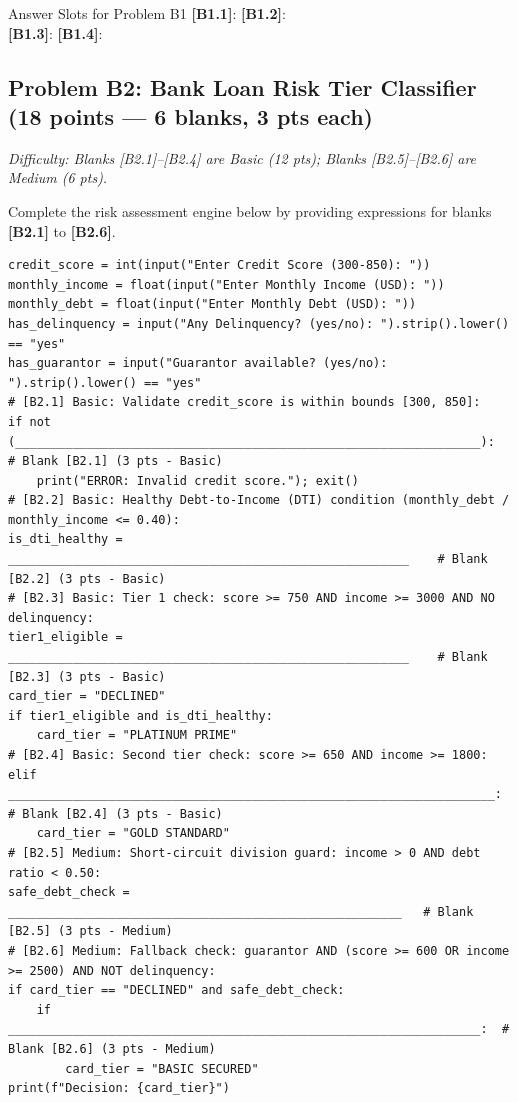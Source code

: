 \documentclass[11pt,a4paper]{article}
\begin{document}
\begin{answerbox}[height=2.0cm]{Answer Slots for Problem B1}
\textbf{[B1.1]}: \dotfill \quad \textbf{[B1.2]}: \dotfill\\[1.5mm]
\textbf{[B1.3]}: \dotfill \quad \textbf{[B1.4]}: \dotfill
\end{answerbox}

\newpage


\subsection*{Problem B2: Bank Loan Risk Tier Classifier (18 points --- 6 blanks, 3 pts each)}
\textit{Difficulty: Blanks [B2.1]--[B2.4] are Basic (12 pts); Blanks [B2.5]--[B2.6] are Medium (6 pts).}

Complete the risk assessment engine below by providing expressions for blanks \textbf{[B2.1]} to \textbf{[B2.6]}.

\begin{lstlisting}
credit_score = int(input("Enter Credit Score (300-850): "))
monthly_income = float(input("Enter Monthly Income (USD): "))
monthly_debt = float(input("Enter Monthly Debt (USD): "))
has_delinquency = input("Any Delinquency? (yes/no): ").strip().lower() == "yes"
has_guarantor = input("Guarantor available? (yes/no): ").strip().lower() == "yes"
# [B2.1] Basic: Validate credit_score is within bounds [300, 850]:
if not (_________________________________________________________________):  # Blank [B2.1] (3 pts - Basic)
    print("ERROR: Invalid credit score."); exit()
# [B2.2] Basic: Healthy Debt-to-Income (DTI) condition (monthly_debt / monthly_income <= 0.40):
is_dti_healthy = ________________________________________________________    # Blank [B2.2] (3 pts - Basic)
# [B2.3] Basic: Tier 1 check: score >= 750 AND income >= 3000 AND NO delinquency:
tier1_eligible = ________________________________________________________    # Blank [B2.3] (3 pts - Basic)
card_tier = "DECLINED"
if tier1_eligible and is_dti_healthy:
    card_tier = "PLATINUM PRIME"
# [B2.4] Basic: Second tier check: score >= 650 AND income >= 1800:
elif ____________________________________________________________________:   # Blank [B2.4] (3 pts - Basic)
    card_tier = "GOLD STANDARD"
# [B2.5] Medium: Short-circuit division guard: income > 0 AND debt ratio < 0.50:
safe_debt_check = _______________________________________________________   # Blank [B2.5] (3 pts - Medium)
# [B2.6] Medium: Fallback check: guarantor AND (score >= 600 OR income >= 2500) AND NOT delinquency:
if card_tier == "DECLINED" and safe_debt_check:
    if __________________________________________________________________:  # Blank [B2.6] (3 pts - Medium)
        card_tier = "BASIC SECURED"
print(f"Decision: {card_tier}")
\end{lstlisting}
\end{document}
